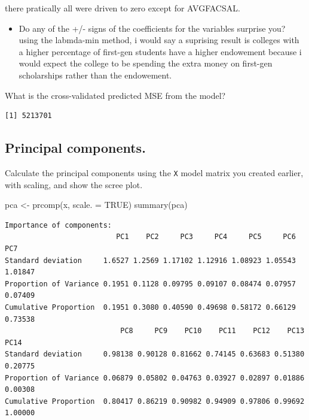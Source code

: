 \documentclass[
  letterpaper,
  DIV=11,
  numbers=noendperiod]{scrartcl}
\newenvironment{Shaded}{\begin{snugshade}}{\end{snugshade}}
\newcommand{\AttributeTok}[1]{\textcolor[rgb]{0.40,0.45,0.13}{#1}}
\newcommand{\ConstantTok}[1]{\textcolor[rgb]{0.56,0.35,0.01}{#1}}
\newcommand{\FloatTok}[1]{\textcolor[rgb]{0.68,0.00,0.00}{#1}}
\newcommand{\FunctionTok}[1]{\textcolor[rgb]{0.28,0.35,0.67}{#1}}
\newcommand{\NormalTok}[1]{\textcolor[rgb]{0.00,0.23,0.31}{#1}}
\newcommand{\OtherTok}[1]{\textcolor[rgb]{0.00,0.23,0.31}{#1}}
\newcommand{\SpecialCharTok}[1]{\textcolor[rgb]{0.37,0.37,0.37}{#1}}
\providecommand{\tightlist}{%
  \setlength{\itemsep}{0pt}\setlength{\parskip}{0pt}}\usepackage{longtable,booktabs,array}
\begin{document}
there pratically all were driven to zero except for AVGFACSAL.

\begin{itemize}
\tightlist
\item
  Do any of the +/- signs of the coefficients for the variables surprise
  you? using the labmda-min method, i would say a suprising result is
  colleges with a higher percentage of first-gen students have a higher
  endowement because i would expect the college to be spending the extra
  money on first-gen scholarships rather than the endowement.
\end{itemize}

What is the cross-validated predicted MSE from the model?

\begin{Shaded}
\end{Shaded}

\begin{verbatim}
[1] 5213701
\end{verbatim}

\subsection{Principal components.}\label{principal-components.}

Calculate the principal components using the \texttt{X} model matrix you
created earlier, with scaling, and show the scree plot.

\begin{Shaded}
\begin{Highlighting}[]
\NormalTok{pca }\OtherTok{\textless{}{-}} \FunctionTok{prcomp}\NormalTok{(x, }\AttributeTok{scale. =} \ConstantTok{TRUE}\NormalTok{)}
\FunctionTok{summary}\NormalTok{(pca)}
\end{Highlighting}
\end{Shaded}

\begin{verbatim}
Importance of components:
                          PC1    PC2     PC3     PC4     PC5     PC6     PC7
Standard deviation     1.6527 1.2569 1.17102 1.12916 1.08923 1.05543 1.01847
Proportion of Variance 0.1951 0.1128 0.09795 0.09107 0.08474 0.07957 0.07409
Cumulative Proportion  0.1951 0.3080 0.40590 0.49698 0.58172 0.66129 0.73538
                           PC8     PC9    PC10    PC11    PC12    PC13    PC14
Standard deviation     0.98138 0.90128 0.81662 0.74145 0.63683 0.51380 0.20775
Proportion of Variance 0.06879 0.05802 0.04763 0.03927 0.02897 0.01886 0.00308
Cumulative Proportion  0.80417 0.86219 0.90982 0.94909 0.97806 0.99692 1.00000
\end{verbatim}
\end{document}
